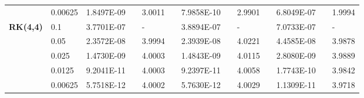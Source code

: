 \documentclass[preprint,compress,3p,10pt,fleqn]{elsarticle}
\numberwithin{equation}{section}
\begin{document}
\begin{table}[H]
\begin{tabular}{lllllrlrlrlrlrl}
\multicolumn{2}{l}{} & \multicolumn{2}{l}{0.00625} & 1.8497E-09 &       & 3.0011  &       & 7.9858E-10 &       & 2.9901  &       & 6.8049E-07 &       & 1.9994  \\
\multicolumn{2}{l}{\multirow{5}[1]{*}{\textbf{RK(4,4)}}} & \multicolumn{2}{l}{0.1} & 3.7701E-07 &       & -     &       & 3.8894E-07 &       & -     &       & 7.0733E-07 &       & - \\
\multicolumn{2}{l}{} & \multicolumn{2}{l}{0.05} & 2.3572E-08 &       & 3.9994  &       & 2.3939E-08 &       & 4.0221  &       & 4.4585E-08 &       & 3.9878  \\
\multicolumn{2}{l}{} & \multicolumn{2}{l}{0.025} & 1.4730E-09 &       & 4.0003  &       & 1.4843E-09 &       & 4.0115  &       & 2.8080E-09 &       & 3.9889  \\
\multicolumn{2}{l}{} & \multicolumn{2}{l}{0.0125} & 9.2041E-11 &       & 4.0003  &       & 9.2397E-11 &       & 4.0058  &       & 1.7743E-10 &       & 3.9842  \\
\multicolumn{2}{l}{} & \multicolumn{2}{l}{0.00625} & 5.7518E-12 &       & 4.0002  &       & 5.7630E-12 &       & 4.0029  &       & 1.1309E-11 &       & 3.9718  \\
\bottomrule
\end{tabular}%
\label{tab:6-1}%
\end{table}%
	
\end{document}
